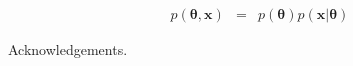 \documentclass[
    ,final            %
  ]
  {aipproc}
\newcommand{\pars}{\boldsymbol{\theta}}
\newcommand{\data}{\mathbf{x}}
\begin{document}
\begin{eqnarray}
p(\pars, \data) &=& p(\pars) p(\data | \pars)
\end{eqnarray}


\begin{theacknowledgments}
Acknowledgements.
\end{theacknowledgments}




%

\end{document}
